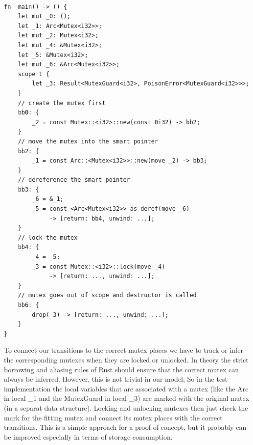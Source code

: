 \begin{lstlisting}

fn  main() -> () {
    let mut _0: ();
    let _1: Arc<Mutex<i32>>;
    let mut _2: Mutex<i32>;
    let mut _4: &Mutex<i32>;
    let _5: &Mutex<i32>;
    let mut _6: &Arc<Mutex<i32>>;
    scope 1 {
        let _3: Result<MutexGuard<i32>, PoisonError<MutexGuard<i32>>>; 
    }
    // create the mutex first
    bb0: {
        _2 = const Mutex::<i32>::new(const 0i32) -> bb2; 
    }
    // move the mutex into the smart pointer
    bb2: {
        _1 = const Arc::<Mutex<i32>>::new(move _2) -> bb3; 
    }
    // dereference the smart pointer
    bb3: {
        _6 = &_1;                        
        _5 = const <Arc<Mutex<i32>> as deref(move _6) 
             -> [return: bb4, unwind: ...]; 
    }
    // lock the mutex
    bb4: {
        _4 = _5;                         
        _3 = const Mutex::<i32>::lock(move _4) 
             -> [return: ..., unwind: ...]; 
    }
    // mutex goes out of scope and destructor is called
    bb6: {
        drop(_3) -> [return: ..., unwind: ...];
    }
}
\end{lstlisting}

To connect our transitions to the correct mutex places we have to track or infer the corresponding mutexes when they are locked or unlocked.
In theory the strict borrowing and aliasing rules of Rust should ensure that the correct mutex can always be inferred.
However, this is not trivial in our model; So in the test implementation the local variables that are associated with a mutex (like the Arc in local \_1 and the MutexGuard in local \_3) are marked with the original mutex (in a separat data structure).
Locking and unlocking mutexes then just check the mark for the fitting mutex and connect its mutex places with the correct transitions.
This is a simple approach for a proof of concept, but it probably can be improved especially in terms of storage consumption.

